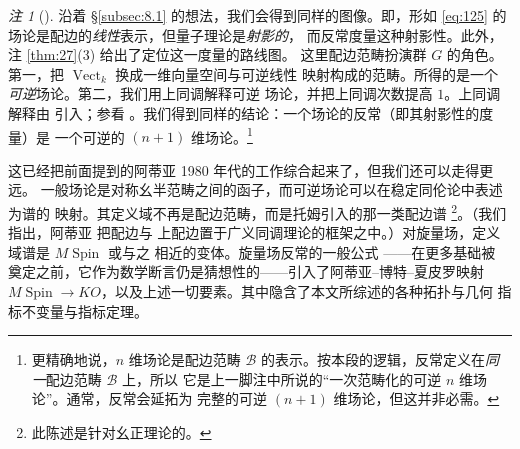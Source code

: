 \documentclass[11pt]{amsart}
\theoremstyle{definition}
\theoremstyle{remark}
\newtheorem{remark}[equation]{注}
\theoremstyle{plain}
\numberwithin{equation}{section}
\renewcommand{\:}{\colon}
\newcommand{\Ahat}{{\hat A}}
\DeclareMathOperator{\Spin}{Spin}
\newcommand{\ZZ}{{\mathbb Z}}
\DeclareMathOperator{\Vect}{Vect}
\newcommand{\Vk}{\Vect_k}
\newcommand{\sB}{\mathscr{B}}
\begin{document}
   \begin{remark}[]\label{thm:34}
  沿着 §\ref{subsec:8.1} 的想法，我们会得到同样的图像。即，形如
 \eqref{eq:125} 的场论是配边的\emph{线性}表示，但量子理论是\emph{射影的}，
 而反常度量这种射影性。此外，注 \ref{thm:27}(3) 给出了定位这一度量的路线图。
 这里配边范畴扮演群 $G$ 的角色。第一，把 $\Vk$ 换成一维向量空间与可逆线性
 映射构成的范畴。所得的是一个\emph{可逆}场论。第二，我们用上同调解释可逆
 场论，并把上同调次数提高 $1$。上同调解释由 \cite{FHT} 引入；参看
 \cite[\S5]{FH}。我们得到同样的结论：一个场论的反常（即其射影性的度量）是
 一个可逆的 $(n+1)$ 维场论。\footnote{更精确地说，$n$ 维场论是配边范畴
 $\sB$ 的表示。按本段的逻辑，反常定义在\emph{同一}配边范畴 $\sB$ 上，所以
 它是上一脚注中所说的“一次范畴化的可逆 $n$ 维场论”。通常，反常会延拓为
 完整的可逆 $(n+1)$ 维场论，但这并非必需。}

   \end{remark}



这已经把前面提到的阿蒂亚 1980 年代的工作综合起来了，但我们还可以走得更远。
一般场论是对称幺半范畴之间的函子，而可逆场论可以在稳定同伦论中表述为谱的
映射。其定义域不再是配边范畴，而是托姆引入的那一类配边谱
\footnote{此陈述是针对幺正理论的。}。（我们指出，阿蒂亚 \cite{A10} 把配边与
上配边置于广义同调理论的框架之中。）对旋量场，定义域谱是 $M\!\Spin$ 或与之
相近的变体。旋量场反常的一般公式 \cite[Conjecture~9.70]{FH}——在更多基础被
奠定之前，它作为数学断言仍是猜想性的——引入了阿蒂亚–博特–夏皮罗映射
$M\!\Spin\to KO$，以及上述一切要素。其中隐含了本文所综述的各种拓扑与几何
指标不变量与指标定理。
\end{document}
